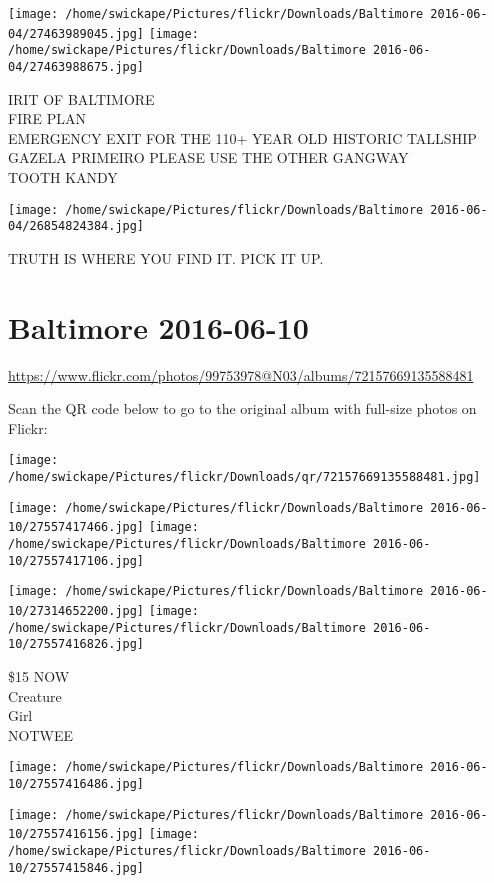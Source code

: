 \documentclass[10pt,letterpaper]{article}
\begin{document}
\texttt{[image: /home/swickape/Pictures/flickr/Downloads/Baltimore 2016-06-04/27463989045.jpg]}
\texttt{[image: /home/swickape/Pictures/flickr/Downloads/Baltimore 2016-06-04/27463988675.jpg]}

IRIT OF BALTIMORE\\
FIRE PLAN\\
EMERGENCY EXIT FOR THE 110+ YEAR OLD HISTORIC TALLSHIP GAZELA PRIMEIRO PLEASE USE THE OTHER GANGWAY\\
TOOTH KANDY
\pagebreak

\texttt{[image: /home/swickape/Pictures/flickr/Downloads/Baltimore 2016-06-04/26854824384.jpg]}

TRUTH IS WHERE YOU FIND IT.  PICK IT UP.
\pagebreak

\section*{Baltimore 2016-06-10}

\url{https://www.flickr.com/photos/99753978@N03/albums/72157669135588481}

Scan the QR code below to go to the original album with full-size photos on Flickr:

\texttt{[image: /home/swickape/Pictures/flickr/Downloads/qr/72157669135588481.jpg]}
\pagebreak

\texttt{[image: /home/swickape/Pictures/flickr/Downloads/Baltimore 2016-06-10/27557417466.jpg]}
\texttt{[image: /home/swickape/Pictures/flickr/Downloads/Baltimore 2016-06-10/27557417106.jpg]}

\texttt{[image: /home/swickape/Pictures/flickr/Downloads/Baltimore 2016-06-10/27314652200.jpg]}
\texttt{[image: /home/swickape/Pictures/flickr/Downloads/Baltimore 2016-06-10/27557416826.jpg]}

\$15 NOW\\
Creature\\
Girl\\
NOTWEE
\pagebreak

\texttt{[image: /home/swickape/Pictures/flickr/Downloads/Baltimore 2016-06-10/27557416486.jpg]}

\vspace{0.25in}
\texttt{[image: /home/swickape/Pictures/flickr/Downloads/Baltimore 2016-06-10/27557416156.jpg]}
\texttt{[image: /home/swickape/Pictures/flickr/Downloads/Baltimore 2016-06-10/27557415846.jpg]}
\end{document}
